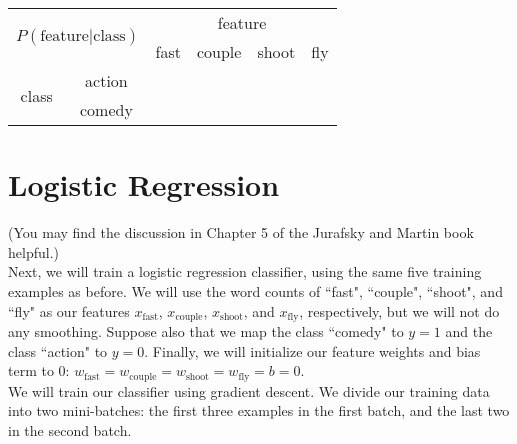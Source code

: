 \documentclass[11pt,letterpaper]{article}
\begin{document}
\begin{center}
\begin{tabular}{|c|c|c|c|c|c|}
\hline 
\multicolumn{2}{|c|}{\multirow{2}{*}{$P(\mathrm{feature|class})$}} & \multicolumn{4}{|c|}{feature} \\ 
\cline{3-6}
\multicolumn{2}{|c|}{} & fast & couple & shoot & fly \\ 
\hline 
\multirow{2}{*}{class} & action &  &  &  & \\ 
\cline{2-6}
& comedy &  &  &  & \\ 
\hline
\end{tabular} 
\end{center}

\section{Logistic Regression}

(You may find the discussion in Chapter 5 of the Jurafsky and Martin book helpful.)\\

\noindent Next, we will train a logistic regression classifier, using the same five training examples as before. We will use the word counts of ``fast", ``couple", ``shoot", and ``fly" as our features $x_\mathrm{fast}$, $x_\mathrm{couple}$, $x_\mathrm{shoot}$, and $x_\mathrm{fly}$, respectively, but we will not do any smoothing. Suppose also that we map the class ``comedy" to $y=1$ and the class ``action" to $y=0$. Finally, we will initialize our feature weights and bias term to 0: $w_\mathrm{fast}=w_\mathrm{couple}=w_\mathrm{shoot}=w_\mathrm{fly}=b=0$.\\

\noindent We will train our classifier using gradient descent. We divide our training data into two mini-batches: the first three examples in the first batch, and the last two in the second batch.
\end{document}
